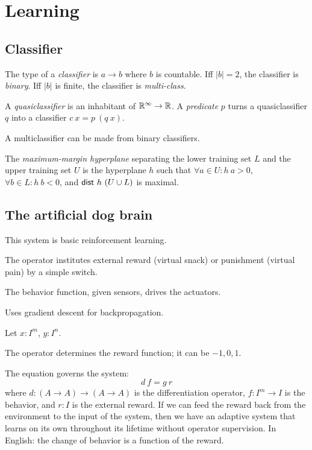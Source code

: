 \chapter{Learning}

\section{Classifier}

%
%
%
The type of a \emph{classifier} is \(a \to b\) where \(b\) is countable.
Iff \(|b| = 2\), the classifier is \emph{binary}.
Iff \(|b|\) is finite, the classifier is \emph{multi-class}.

A \emph{quasiclassifier} is an inhabitant of \(\mathbb{R}^\infty \to \mathbb{R}\).
A \emph{predicate} \(p\) turns a quasiclassifier \(q\) into a classifier \(c~x = p~(q~x)\).

A multiclassifier can be made from binary classifiers.

%
%
The \emph{maximum-margin hyperplane} separating
the lower training set \(L\) and the upper training set \(U\)
is the hyperplane \(h\)
such that
\(\forall a \in U : h~a > 0\),
\,\(\forall b \in L : h~b < 0\),
and \(\textsf{dist}~h~(U \cup L)\) is maximal.

\section{The artificial dog brain}

This system is basic reinforcement learning.

The operator institutes external reward
(virtual snack) or punishment (virtual pain)
by a simple switch.

The behavior function, given sensors, drives the actuators.

Uses gradient descent for backpropagation.

Let \( x : I^m \), \( y : I^n \).

The operator determines the reward function;
it can be \(-1,0,1\).

The equation governs the system:
\[
    d~f = g~r
\]
where \(d : (A \to A) \to (A \to A)\) is the differentiation operator,
\( f : I^m \to I \) is the behavior,
and \( r : I \) is the external reward.
If we can feed the reward back from
the environment to the input of the system,
then we have an adaptive system that
learns on its own throughout its lifetime without operator supervision.
In English: the change of behavior is a function of the reward.

